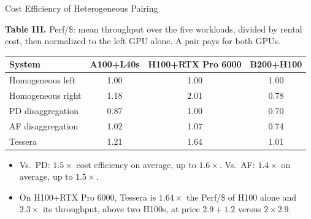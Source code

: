 \begin{frame}[t,label=mm_ts_cost_01]{Cost Efficiency of Heterogeneous Pairing}

  \par
  \vspace{.06cm}
  {\footnotesize\textbf{Table III.} Perf/\$: mean throughput over the five workloads, divided by rental cost, then normalized to the left GPU alone. A pair pays for both GPUs.}\par
  \vspace{.05cm}
  {\centering\footnotesize
  \begin{tabular}{lccc}\toprule
    System & A100+L40s & H100+RTX Pro 6000 & B200+H100\\\midrule
    Homogeneous left & 1.00 & 1.00 & 1.00\\
    Homogeneous right & 1.18 & 2.01 & 0.78\\
    PD disaggregation & 0.87 & 1.00 & 0.70\\
    AF disaggregation & 1.02 & 1.07 & 0.74\\
    Tessera & 1.21 & 1.64 & 1.01\\\bottomrule
  \end{tabular}\par}
  \vspace{.06cm}
  \begin{itemize}\footnotesize
    \setlength{\itemsep}{.08cm}
    \item Vs.\ PD: \(1.5\times\) cost efficiency on average, up to \(1.6\times\). Vs.\ AF: \(1.4\times\) on average, up to \(1.5\times\).
    \item On H100+RTX Pro 6000, Tessera is \(1.64\times\) the Perf/\$ of H100 alone and \(2.3\times\) its throughput, above two H100s, at price \(2.9+1.2\) versus \(2\times 2.9\).
  \end{itemize}
  \vspace{.10cm}
\end{frame}

